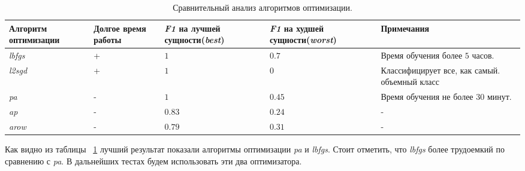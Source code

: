 \documentclass{csmathnotes}
\begin{document}
\begin{table}[!h]
    \begin{center}
        \begin{tabular}{|p{2cm}|p{1.6cm}|p{1.5cm}|p{1.5cm}|p{2.5cm}|}
            \hline
            Алгоритм оптимизации &  Долгое время работы & \emph{F1} на лучшей сущности(\emph{best}) & \emph{F1} на худшей сущности(\emph{worst}) & Примечания \\
            \hline
            \emph{lbfgs} & + & $1$ & $0.7$ & Время обучения более $5$ часов.  \\
            \hline
            \emph{l2sgd} & + & $1$  & $0$ & Классифицирует все, как самый. объемный класс \\
            \hline
            \emph{pa} & - & $1$  & $0.45$ & Время обучения не более $30$ минут. \\
            \hline
            \emph{ap} & - & $0.83$ & $0.24$  & - \\
            \hline
            \emph{arow} & - & $0.79$ & $0.31$  & - \\
            \hline
        \end{tabular}
    \end{center}
    \caption{\label{tabl:table1}Сравнительный анализ алгоритмов оптимизации.}
\end{table}

Как видно из таблицы ~\ref{tabl:table1} лучший результат показали алгоритмы оптимизации \emph{pa} и \emph{lbfgs}. Стоит отметить, что \emph{lbfgs}  более трудоемкий по сравнению с \emph{pa}. В дальнейших тестах будем использовать эти два оптимизатора.
\end{document}

